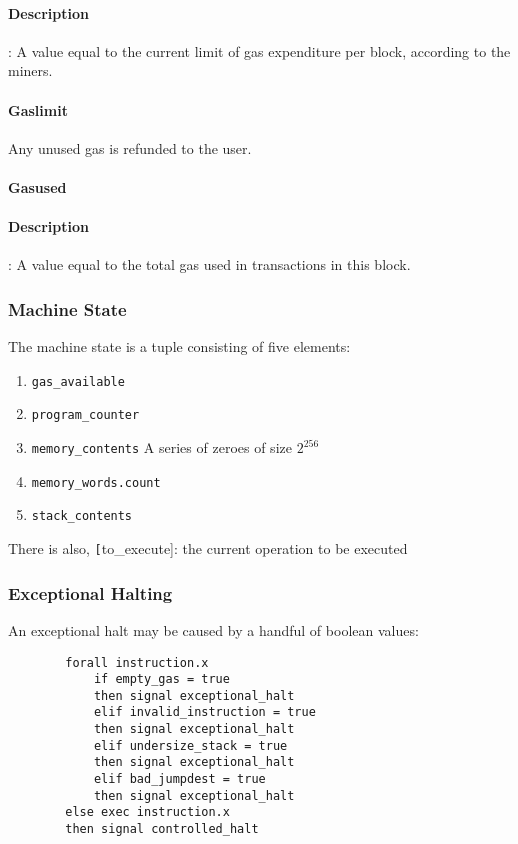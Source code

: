 \documentclass[10pt,a4paper,leqno,bibliography=totoc]{scrartcl}
\newenvironment{alphafootnotes}
{\par\edef\savedfootnotenumber{\number\value{footnote}}
\renewcommand{\thefootnote}{\alph{footnote}}
\setcounter{footnote}{0}}
{\par\setcounter{footnote}{\savedfootnotenumber}}
\begin{document}
\begin{alphafootnotes}
\begin{multicols*}{2}
					\paragraph{Description}: A value equal to the current limit of gas expenditure per block, according to the miners. 
				\paragraph{Gaslimit}
					Any unused gas is refunded to the user.

				\paragraph{Gasused}
		\paragraph{Description}: A value equal to the total gas used in transactions in this block. 

			\subsubsection{Machine State}
			The machine state is a tuple consisting of five elements:
		
		\begin{enumerate}
			\item \texttt{gas\_available}
			\item \texttt{program\_counter}
			\item \texttt{memory\_contents} A series of zeroes of size $2^{256}$
			\item \texttt{memory\_words.count}
			\item \texttt{stack\_contents}
		\end{enumerate}
		
		There is also, \texttt[to\_execute]: the current operation to be executed
		
		\subsubsection{Exceptional Halting}
		An exceptional halt may be caused by a handful of boolean values:
		
		\begin{verbatim}
		forall instruction.x
			if empty_gas = true
			then signal exceptional_halt
			elif invalid_instruction = true
			then signal exceptional_halt
			elif undersize_stack = true
			then signal exceptional_halt
			elif bad_jumpdest = true
			then signal exceptional_halt
		else exec instruction.x	
		then signal controlled_halt
		\end{verbatim}
		

\end{multicols*}
\end{alphafootnotes}
\end{document}

